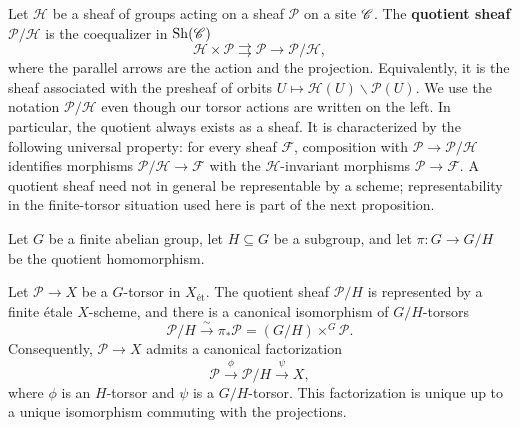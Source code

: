 Let $\mathcal{H}$ be a sheaf of groups acting on a sheaf $\mathcal{P}$ on a
site $\mathscr{C}$. The \textbf{quotient sheaf} $\mathcal{P}/\mathcal{H}$ is the
coequalizer in $\operatorname{Sh}(\mathscr{C})$
\[
\mathcal{H}\times\mathcal{P}
\rightrightarrows
\mathcal{P}\longrightarrow\mathcal{P}/\mathcal{H},
\]
where the parallel arrows are the action and the projection.
Equivalently, it is the sheaf associated with the presheaf of orbits
$U\mapsto\mathcal{H}(U)\backslash\mathcal{P}(U)$. We use the notation
$\mathcal{P}/\mathcal{H}$ even though our torsor actions are written on the
left. In particular, the quotient always exists as a sheaf. It is
characterized by the following universal property:
for every sheaf $\mathcal{F}$, composition with
$\mathcal{P}\to\mathcal{P}/\mathcal{H}$ identifies morphisms
$\mathcal{P}/\mathcal{H}\to\mathcal{F}$ with the
$\mathcal{H}$-invariant morphisms $\mathcal{P}\to\mathcal{F}$. A quotient
sheaf need not in general be representable by a scheme; representability in
the finite-torsor situation used here is part of the next proposition.

Let $G$ be a finite abelian group, let $H\subseteq G$ be a subgroup, and let
$\pi:G\to G/H$ be the quotient homomorphism.

\begin{prop}\label{prop:quotient_torsors_finite}\label{prop:quotient_torsors}
Let $\mathcal{P}\to X$ be a $G$-torsor in $X_{\text{ét}}$. The quotient sheaf
$\mathcal{P}/H$ is represented by a finite étale $X$-scheme, and there is a
canonical isomorphism of $G/H$-torsors
\[
\mathcal{P}/H \xrightarrow{\sim}
\pi_*\mathcal{P}=(G/H)\times^G\mathcal{P}.
\]
Consequently, $\mathcal{P}\to X$ admits a canonical factorization
\[
\mathcal{P}\xrightarrow{\phi}\mathcal{P}/H\xrightarrow{\psi}X,
\]
where $\phi$ is an $H$-torsor and $\psi$ is a $G/H$-torsor. This
factorization is unique up to a unique isomorphism commuting with the
projections.
\end{prop}

